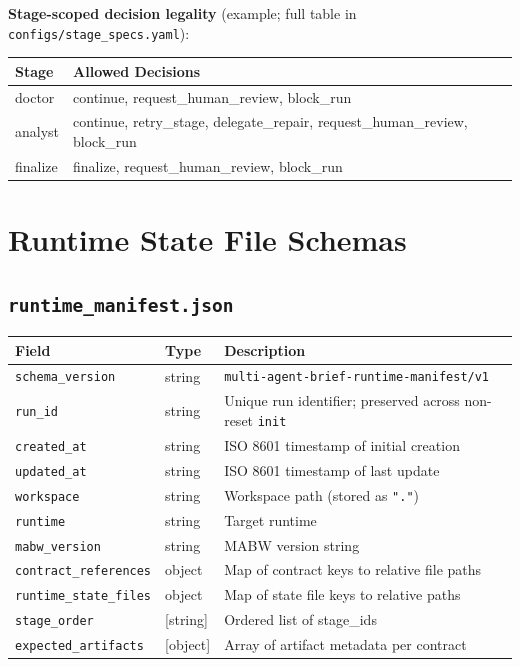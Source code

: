 \documentclass[11pt,a4paper]{article}
\begin{document}
\textbf{Stage-scoped decision legality} (example; full table in \texttt{configs/stage\_specs.yaml}):

\begin{table}[ht]
\centering
\begin{tabular}{@{}ll@{}}
\toprule
\textbf{Stage} & \textbf{Allowed Decisions} \\
\midrule
doctor & continue, request\_human\_review, block\_run \\
analyst & continue, retry\_stage, delegate\_repair, request\_human\_review, block\_run \\
finalize & finalize, request\_human\_review, block\_run \\
\bottomrule
\end{tabular}
\end{table}

\section{Runtime State File Schemas}
\label{sec:appendix-schemas}

\subsection{\texttt{runtime\_manifest.json}}

\begin{table}[ht]
\centering
\footnotesize
\begin{tabular}{@{}lll@{}}
\toprule
\textbf{Field} & \textbf{Type} & \textbf{Description} \\
\midrule
\texttt{schema\_version} & string & \texttt{multi-agent-brief-runtime-manifest/v1} \\
\texttt{run\_id} & string & Unique run identifier; preserved across non-reset \texttt{init} \\
\texttt{created\_at} & string & ISO 8601 timestamp of initial creation \\
\texttt{updated\_at} & string & ISO 8601 timestamp of last update \\
\texttt{workspace} & string & Workspace path (stored as \texttt{"."}) \\
\texttt{runtime} & string & Target runtime \\
\texttt{mabw\_version} & string & MABW version string \\
\texttt{contract\_references} & object & Map of contract keys to relative file paths \\
\texttt{runtime\_state\_files} & object & Map of state file keys to relative paths \\
\texttt{stage\_order} & [string] & Ordered list of stage\_ids \\
\texttt{expected\_artifacts} & [object] & Array of artifact metadata per contract \\
\bottomrule
\end{tabular}
\end{table}
\end{document}
